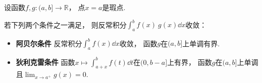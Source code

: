 \begin{theorem}\label{theorem:反常积分.无界函数的反常积分的阿贝尔--狄利克雷审敛法}
设函数\(f,g\colon(a,b]\to\mathbb{R}\)，
点\(x=a\)是瑕点.

若下列两个条件之一满足，
则反常积分\(\int_a^b f(x) ~ g(x) \dd{x}\)收敛：\begin{itemize}
	\item {\rm\bf 阿贝尔条件}
	反常积分\(\int_a^b f(x) \dd{x}\)收敛，
	函数\(g\)在\((a,b]\)上单调有界.

	\item {\rm\bf 狄利克雷条件}
	函数\(x \mapsto \int_{a+x}^b f(t) \dd{t}\)在\((0,b-a]\)上有界，
	函数\(g\)在\((a,b]\)上单调且\(\lim_{x \to a^+} g(x) = 0\).
\end{itemize}
\end{theorem}

